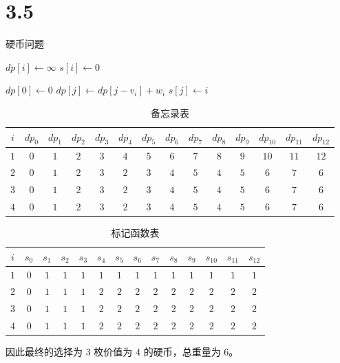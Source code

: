 \section*{3.5}

\begin{algorithm}[!htbp]
  \caption{硬币问题}
  \begin{algorithmic}[1]
      \State $dp[i] \gets \infty$
      \State $s[i] \gets 0$
    \EndFor

    \State $dp[0] \gets 0$
          \State $dp[j] \gets dp[j - v_i] + w_i$
          \State $s[j] \gets i$
        \EndIf
      \EndFor
    \EndFor
  \EndProcedure
  \end{algorithmic}
\end{algorithm}

\begin{table}[!htbp]
\centering
\begin{tabular}{|c|c|c|c|c|c|c|c|c|c|c|c|c|c|}
  \hline
  $i$ & $dp_{0}$ & $dp_{1}$ & $dp_{2}$ & $dp_{3}$ & $dp_{4}$ & $dp_{5}$ & $dp_{6}$ & $dp_{7}$ & $dp_{8}$ & $dp_{9}$ & $dp_{10}$ & $dp_{11}$ & $dp_{12}$ \\
  \hline
  $1$ & $0$ & $1$ & $2$ & $3$ & $4$ & $5$ & $6$ & $7$ & $8$ & $9$ & $10$ & $11$ & $12$ \\
  $2$ & $0$ & $1$ & $2$ & $3$ & $2$ & $3$ & $4$ & $5$ & $4$ & $5$ & $6$ & $7$ & $6$ \\
  $3$ & $0$ & $1$ & $2$ & $3$ & $2$ & $3$ & $4$ & $5$ & $4$ & $5$ & $6$ & $7$ & $6$ \\
  $4$ & $0$ & $1$ & $2$ & $3$ & $2$ & $3$ & $4$ & $5$ & $4$ & $5$ & $6$ & $7$ & $6$ \\
  \hline
\end{tabular}
\caption{备忘录表}
\end{table}

\begin{table}[!htbp]
\centering
\begin{tabular}{|c|c|c|c|c|c|c|c|c|c|c|c|c|c|}
  \hline
  $i$ & $s_{0}$ & $s_{1}$ & $s_{2}$ & $s_{3}$ & $s_{4}$ & $s_{5}$ & $s_{6}$ & $s_{7}$ & $s_{8}$ & $s_{9}$ & $s_{10}$ & $s_{11}$ & $s_{12}$ \\
  \hline
  $1$ & $0$ & $1$ & $1$ & $1$ & $1$ & $1$ & $1$ & $1$ & $1$ & $1$ & $1$ & $1$ & $1$ \\
  $2$ & $0$ & $1$ & $1$ & $1$ & $2$ & $2$ & $2$ & $2$ & $2$ & $2$ & $2$ & $2$ & $2$ \\
  $3$ & $0$ & $1$ & $1$ & $1$ & $2$ & $2$ & $2$ & $2$ & $2$ & $2$ & $2$ & $2$ & $2$ \\
  $4$ & $0$ & $1$ & $1$ & $1$ & $2$ & $2$ & $2$ & $2$ & $2$ & $2$ & $2$ & $2$ & $2$ \\
  \hline
\end{tabular}
\caption{标记函数表}
\end{table}

因此最终的选择为 $3$ 枚价值为 $4$ 的硬币，总重量为 $6$。
